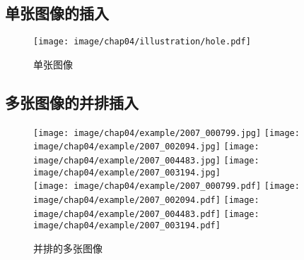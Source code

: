\subsection{单张图像的插入}

\begin{figure}[h]
    \centering
    \texttt{[image: image/chap04/illustration/hole.pdf]}
    \caption{单张图像}
     \label{fig:hole}
\end{figure}


\subsection{多张图像的并排插入}


\begin{figure}[h!]%
    \centering
    \texttt{[image: image/chap04/example/2007\_000799.jpg]}
    \texttt{[image: image/chap04/example/2007\_002094.jpg]}
    \texttt{[image: image/chap04/example/2007\_004483.jpg]}
    \texttt{[image: image/chap04/example/2007\_003194.jpg]}
    \\
    \texttt{[image: image/chap04/example/2007\_000799.pdf]}
    \texttt{[image: image/chap04/example/2007\_002094.pdf]}
    \texttt{[image: image/chap04/example/2007\_004483.pdf]}
    \texttt{[image: image/chap04/example/2007\_003194.pdf]}
    \caption{并排的多张图像}
    \label{fig:multi-image-example1}
\end{figure}


